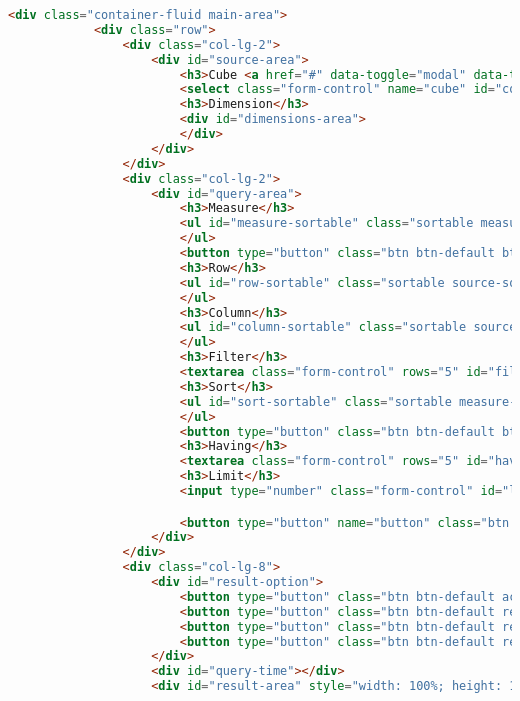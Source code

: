 \begin{lstlisting}[language=HTML,basicstyle=\tiny,caption=reporting.html]
        <div class="container-fluid main-area">
            <div class="row">
                <div class="col-lg-2">
                    <div id="source-area">
                        <h3>Cube <a href="#" data-toggle="modal" data-target="#cube-modal"><span class="glyphicon glyphicon-plus"><span></a></h3>
                        <select class="form-control" name="cube" id="connection-select"><option></option></select>
                        <h3>Dimension</h3>
                        <div id="dimensions-area">
                        </div>
                    </div>
                </div>
                <div class="col-lg-2">
                    <div id="query-area">
                        <h3>Measure</h3>
                        <ul id="measure-sortable" class="sortable measure-sortable query-measure-sortable">
                        </ul>
                        <button type="button" class="btn btn-default btn-block" data-toggle="modal" data-target="#measure-modal" style="display: none" id="measure-sortable-btn"><span class="glyphicon glyphicon-plus"></span> Add Measure</button>
                        <h3>Row</h3>
                        <ul id="row-sortable" class="sortable source-sortable">
                        </ul>
                        <h3>Column</h3>
                        <ul id="column-sortable" class="sortable source-sortable">
                        </ul>
                        <h3>Filter</h3>
                        <textarea class="form-control" rows="5" id="filter"></textarea>
                        <h3>Sort</h3>
                        <ul id="sort-sortable" class="sortable measure-sortable query-measure-sortable">
                        </ul>
                        <button type="button" class="btn btn-default btn-block" data-toggle="modal" data-target="#sort-modal" style="display: none" id="sort-sortable-btn"><span class="glyphicon glyphicon-plus"></span> Add Sort</button>
                        <h3>Having</h3>
                        <textarea class="form-control" rows="5" id="having"></textarea>
                        <h3>Limit</h3>
                        <input type="number" class="form-control" id="limit"><br><br>

                        <button type="button" name="button" class="btn btn-success btn-block" id="run-query">Run Query</button>
                    </div>
                </div>
                <div class="col-lg-8">
                    <div id="result-option">
                        <button type="button" class="btn btn-default active reporting-type" data-type="table"><span class="fa fa-table"></span></button>
                        <button type="button" class="btn btn-default reporting-type" data-type="line"><span class="fa fa-line-chart"></span></button>
                        <button type="button" class="btn btn-default reporting-type" data-type="bar"><span class="fa fa-bar-chart"></span></button>
                        <button type="button" class="btn btn-default reporting-type" data-type="pie"><span class="fa fa-pie-chart"></span></button>
                    </div>
                    <div id="query-time"></div>
                    <div id="result-area" style="width: 100%; height: 1000px; overflow: scroll;">


\end{lstlisting}
